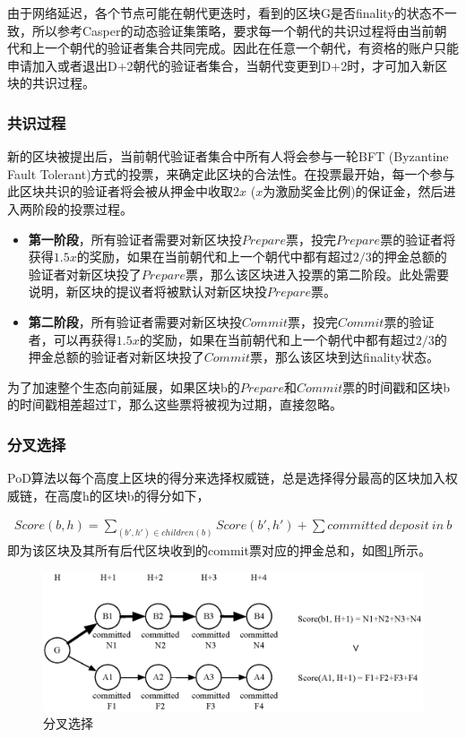 由于网络延迟，各个节点可能在朝代更迭时，看到的区块G是否finality的状态不一致，所以参考Casper的动态验证集策略，要求每一个朝代的共识过程将由当前朝代和上一个朝代的验证者集合共同完成。因此在任意一个朝代，有资格的账户只能申请加入或者退出D+2朝代的验证者集合，当朝代变更到D+2时，才可加入新区块的共识过程。

\subsubsection{共识过程}
\label{pod:design:consensus}

新的区块被提出后，当前朝代验证者集合中所有人将会参与一轮BFT (Byzantine Fault Tolerant)方式的投票，来确定此区块的合法性。在投票最开始，每一个参与此区块共识的验证者将会被从押金中收取$2x$ ($x$为激励奖金比例)的保证金，然后进入两阶段的投票过程。

\begin{itemize}
\item \textbf{第一阶段}，所有验证者需要对新区块投$Prepare$票，投完$Prepare$票的验证者将获得$1.5x$的奖励，如果在当前朝代和上一个朝代中都有超过$2/3$的押金总额的验证者对新区块投了$Prepare$票，那么该区块进入投票的第二阶段。此处需要说明，新区块的提议者将被默认对新区块投$Prepare$票。

\item \textbf{第二阶段}，所有验证者需要对新区块投$Commit$票，投完$Commit$票的验证者，可以再获得$1.5x$的奖励，如果在当前朝代和上一个朝代中都有超过$2/3$的押金总额的验证者对新区块投了$Commit$票，那么该区块到达finality状态。
\end{itemize}

为了加速整个生态向前延展，如果区块b的$Prepare$和$Commit$票的时间戳和区块b的时间戳相差超过T，那么这些票将被视为过期，直接忽略。

\subsubsection{分叉选择}
\label{pod:design:fork}

PoD算法以每个高度上区块的得分来选择权威链，总是选择得分最高的区块加入权威链，在高度h的区块b的得分如下，

\begin{align}
Score(b, h) = \sum_{(b',h') \in children(b)}Score(b', h') + \sum committed~deposit~in~b
\end{align}
\noindent 即为该区块及其所有后代区块收到的commit票对应的押金总和，如图\ref{fig:fork_choice}所示。

\begin{figure}[h]
\centering
\includegraphics[width=12cm]{./figs/fork}
\caption{分叉选择}
\label{fig:fork_choice}
\end{figure}

